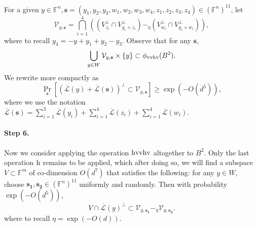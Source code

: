 \documentclass[12pt]{article}
\newcommand{\F}{\mathbb{F}}
\newcommand{\hr}{\textup{h}}
\newcommand{\vr}{\textup{v}}
\newcommand{\LL}{\mathcal{L}}
\newcommand{\s}{\mathbf{s}}
\begin{document}
For a given $y \in \F^n, \s = (y_1,y_2,y_3,w_1,w_2,w_3,w_4,z_1,z_2,z_3,z_4) \in (\F^n)^{11}$, let
$$\mathcal{V}_{y,\s} =  \bigcap_{i=1}^4 \left( \left( V^\perp_{z_i}\cap V^\perp_{y_i+z_i} \right) -_\eta  \left( V^\perp_{w_i} \cap V^\perp_{y_i+w_i} \right)  \right),$$
where to recall $y_4 = -y + y_1 + y_2 - y_3$. Observe that for any $\s$,
$$
\bigcup_{y \in W} \mathcal{V}_{y,\s} \times \{y\} \subset \phi_{\vr\vr\hr\vr}(B^2).
$$
We rewrite  more compactly as
\begin{equation}\label{equation:allintersectionscompact}
\Pr_{\s} \left[ \left( \overline{\LL}(y) +\overline{\LL}(\s)\right)^\perp  \subset \mathcal{V}_{y,\s} \right] \ge \exp(-O(d^5)),
\end{equation}
where we use the notation $\overline{\LL}(\s) =  \sum_{i=1}^3 \overline{\LL}(y_i)+ \sum_{i=1}^4 \overline{\LL}(z_i)+ \sum_{i=1}^4 \overline{\LL}(w_i)$.

\paragraph{Step 6.}
Now we consider applying the operation $\hr\vr\vr\hr\vr$ altogether to $B^2$. Only the last operation $\hr$ remains to be applied, which after doing so, we will find a subspace $V\subset\F^m$ of co-dimension $O(d^7)$ that satisfies the following: for any $y\in W$,  choose  $\mathbf{s_1}, \mathbf{s_2}\in(\F^n)^{11}$ uniformly and randomly. Then with probability $\exp(-O(d^5))$,
$$V\cap \overline{\LL}(y)^\perp \subset \mathcal{V}_{y,\mathbf{s_1}}-_\eta \mathcal{V}_{y,\mathbf{s_2}}.$$
where to recall $\eta = \exp(-O(d))$.
\end{document}
